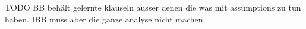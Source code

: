 TODO BB behält gelernte klauseln ausser denen die was mit assumptions zu tun haben. IBB muss aber die ganze analyse nicht machen

